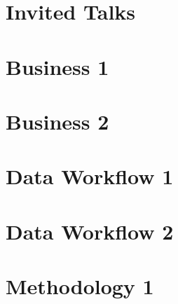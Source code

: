 \documentclass[11pt,oneside]{book}
\begin{document}
\mainmatter

\pagestyle{mainmatter}%

\chapter{Invited Talks}











\chapter{Business 1}






\chapter{Business 2}






\chapter{Data Workflow 1}






\chapter{Data Workflow 2}





\chapter{Methodology 1}



\end{document}
